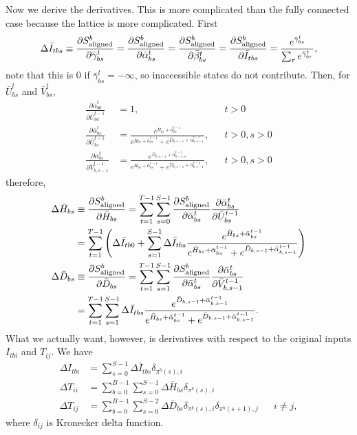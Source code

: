 \documentclass[a4paper]{article}
\begin{document}
Now we derive the derivatives. This is more complicated than the fully connected case because the lattice is more complicated. First
\begin{equation}
\Delta \bar{I}_{tbs} \equiv \frac{\partial S^b_{\rm{aligned}}}{\partial\bar\gamma^t_{bs}}=\frac{\partial S^b_{\rm{aligned}}}{\partial\bar\alpha^t_{bs}}=\frac{\partial S^b_{\rm{aligned}}}{\partial\bar\beta^t_{bs}}=\frac{\partial S^b_{\rm{aligned}}}{\partial \bar I_{tbs}}=\frac{e^{\bar\gamma^t_{bs}}}{\sum_r e^{\bar\gamma^t_{br}}},
\end{equation}
note that this is $0$ if $\bar\gamma^t_{bs}=-\infty$, so inaccessible states do not contribute. Then, for $\bar U^{t}_{bs}$ and $\bar V^{t}_{bs}$,
\begin{align}
\frac{\partial \bar\alpha^t_{b0}}{\partial \bar{U}^{t-1}_{b0}} &= 1, 
&& t>0 \\
\frac{\partial \bar\alpha^t_{bs}}{\partial \bar{U}^{t-1}_{bs}}
&=\frac{e^{\bar{H}_{bs}+\bar\alpha^{t-1}_{bs}}}{e^{\bar{H}_{bs}+\bar\alpha^{t-1}_{bs}} + e^{\bar{D}_{b,s-1}+\bar\alpha^{t-1}_{b,s-1}}},
&& t>0, s>0\\
\frac{\partial \bar\alpha^t_{bs}}{\partial \bar{V}^{t-1}_{b,s-1}}
&=\frac{e^{\bar{D}_{b,s-1}+\bar\alpha^{t-1}_{b-1,s}}}{e^{\bar{H}_{bs}+\bar\alpha^{t-1}_{bs}} + e^{\bar{D}_{b,s-1}+\bar\alpha^{t-1}_{b,s-1}}},
&& t>0, s>0
\end{align}
therefore,
\begin{align}
\Delta\bar{H}_{bs}&\equiv\frac{\partial S^b_{\rm{aligned}}}{\partial\bar{H}_{bs}}
=\sum_{t=1}^{T-1}\sum_{s=0}^{S-1}\frac{\partial S^b_{\rm{aligned}}}{\partial\bar\alpha^t_{bs}}\frac{\partial\bar\alpha^t_{bs}}{\partial\bar U^{t-1}_{bs}}\\
&=\sum_{t=1}^{T-1}\left(\Delta\bar I_{tb0}+\sum_{s=1}^{S-1}\Delta\bar I_{tbs}\frac{e^{\bar{H}_{bs}+\bar\alpha^{t-1}_{bs}}}{e^{\bar{H}_{bs}+\bar\alpha^{t-1}_{bs}} + e^{\bar{D}_{b,s-1}+\bar\alpha^{t-1}_{b,s-1}}}\right)\\
\Delta\bar{D}_{bs}&\equiv\frac{\partial S^b_{\rm{aligned}}}{\partial\bar{D}_{bs}}
=\sum_{t=1}^{T-1}\sum_{s=1}^{S-1}\frac{\partial S^b_{\rm{aligned}}}{\partial\bar\alpha^t_{bs}}\frac{\partial\bar\alpha^t_{bs}}{\partial\bar V^{t-1}_{b,s-1}}\\
&=\sum_{t=1}^{T-1}\sum_{s=1}^{S-1}\Delta\bar I_{tbs}\frac{e^{\bar{D}_{b,s-1}+\bar\alpha^{t-1}_{b,s-1}}}{e^{\bar{H}_{bs}+\bar\alpha^{t-1}_{bs}} + e^{\bar{D}_{b,s-1}+\bar\alpha^{t-1}_{b,s-1}}}.
\end{align}
What we actually want, however, is derivatives with respect to the original inputs $I_{tbi}$ and $T_{ij}$. We have
\begin{align}
\Delta I_{tbi}&=\sum_{s=0}^{S-1}\Delta\bar I_{tbs}\delta_{\pi^b(s),i}\\
\Delta T_{ii}&=\sum_{b=0}^{B-1}\sum_{s=0}^{S-1}\Delta\bar H_{bs} \delta_{\pi^b(s),i}\\
\Delta T_{ij}&=\sum_{b=0}^{B-1}\sum_{s=0}^{S-2}\Delta\bar D_{bs} \delta_{\pi^b(s),i}\delta_{\pi^b(s+1),j} && i\neq j,
\end{align}
where $\delta_{ij}$ is Kronecker delta function.
\end{document}
